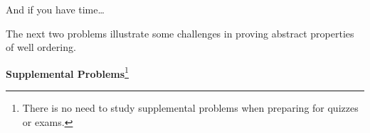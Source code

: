 \documentclass[handout]{mcs}
\begin{document}



\instatements{\newpage}




\instatements{\newpage}

And if you have time\dots

\begin{staffnotes}
The next two problems illustrate some challenges in proving abstract
properties of well ordering.  
\end{staffnotes}

\begin{center}
\textbf{Supplemental Problems}\footnote{There is no need to study supplemental
  problems when preparing for quizzes or exams.}
\end{center}


\end{document}
